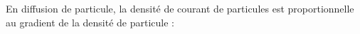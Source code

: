 \documentclass[a4paper]{article}
\begin{document}
\pagestyle{fancy}
\fancyhf{}
\setlength{\headheight}{15pt}

\begin{center}
	\large{}
\end{center}


En diffusion de particule, la densité de courant de particules est proportionnelle au gradient de la densité de particule :
\begin{center}
\end{center}
\end{document}

